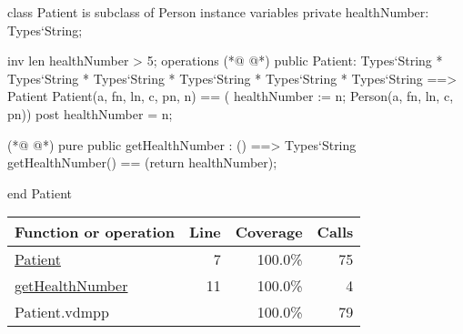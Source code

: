 \begin{vdmpp}[breaklines=true]
class Patient is subclass of Person
instance variables
  private healthNumber: Types`String;
  
  inv len healthNumber > 5;
operations
(*@
\label{Patient:7}
@*)
 public Patient: Types`String * Types`String * Types`String * Types`String * Types`String * Types`String ==> Patient
  Patient(a, fn, ln, c, pn, n) == ( healthNumber := n; Person(a, fn, ln, c, pn))
 post healthNumber = n;
 
(*@
\label{getHealthNumber:11}
@*)
 pure public getHealthNumber : () ==> Types`String
  getHealthNumber() == (return healthNumber);

end Patient
\end{vdmpp}
\bigskip
\begin{longtable}{|l|r|r|r|}
\hline
Function or operation & Line & Coverage & Calls \\
\hline
\hline
\hyperref[Patient:7]{Patient} & 7&100.0\% & 75 \\
\hline
\hyperref[getHealthNumber:11]{getHealthNumber} & 11&100.0\% & 4 \\
\hline
\hline
Patient.vdmpp & & 100.0\% & 79 \\
\hline
\end{longtable}

